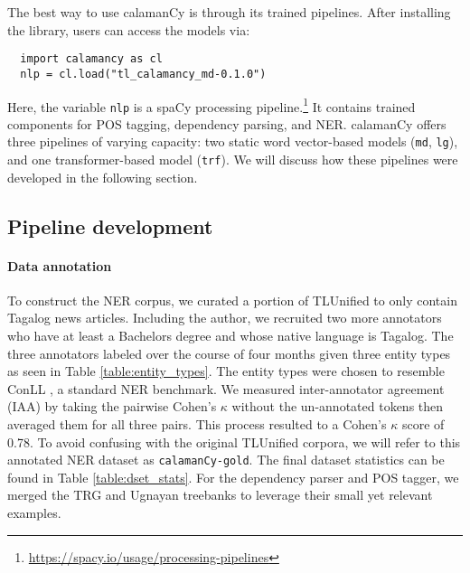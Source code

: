\documentclass[11pt]{article}
\begin{document}
The best way to use calamanCy is through its trained pipelines.
After installing the library, users can access the models via:

\begin{verbatim}
  import calamancy as cl
  nlp = cl.load("tl_calamancy_md-0.1.0")
\end{verbatim}

Here, the variable \texttt{nlp} is a spaCy processing pipeline.\footnote[2]{\url{https://spacy.io/usage/processing-pipelines}}
It contains trained components for POS tagging, dependency parsing, and NER.
calamanCy offers three pipelines of varying capacity: two static word vector-based models (\texttt{md}, \texttt{lg}), and one transformer-based model (\texttt{trf}).
We will discuss how these pipelines were developed in the following section.

\subsection{Pipeline development}

\paragraph*{Data annotation}
To construct the NER corpus, we curated a portion of TLUnified \citep{Cruz2021ImprovingLL} to only contain Tagalog news articles.
Including the author, we recruited two more annotators who have at least a Bachelors degree and whose native language is Tagalog.
The three annotators labeled over the course of four months given three entity types as seen in Table \ref{table:entity_types}.
The entity types were chosen to resemble ConLL \citep{Sang2002IntroductionTT,Sang2003IntroductionTT}, a standard NER benchmark.
We measured inter-annotator agreement (IAA) by taking the pairwise Cohen's $\kappa$ without the un-annotated tokens then averaged them for all three pairs.
This process resulted to a Cohen's $\kappa$ score of 0.78. 
To avoid confusing with the original TLUnified corpora, we will refer to this annotated NER dataset as \texttt{calamanCy-gold}.
The final dataset statistics can be found in Table \ref{table:dset_stats}.
For the dependency parser and POS tagger, we merged the TRG \citep{Samson2018TRG} and Ugnayan \citep{Aquino2020ParsingIT} treebanks to leverage their small yet relevant examples.






\end{document}
